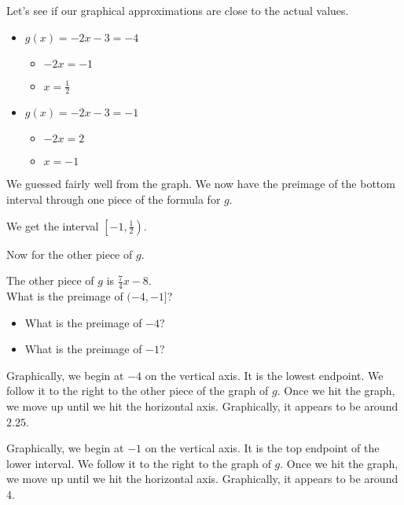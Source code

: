 \documentclass{ximera}
\begin{document}
Let's see if our graphical approximations are close to the actual values.



\begin{itemize}
\item $g(x) = -2x-3 = -4$
\begin{itemize}
\item $-2x = -1$
\item $x = \frac{1}{2}$
\end{itemize}
\end{itemize}

\begin{itemize}
\item $g(x) = -2x-3 = -1$
\begin{itemize}
\item $-2x = 2$
\item $x = -1$
\end{itemize}
\end{itemize}



We guessed fairly well from the graph.  We now have the preimage of the bottom interval through one piece of the formula for $g$.  


We get the interval $\left[ -1, \frac{1}{2} \right)$.


Now for the other piece of $g$.







The other piece of $g$ is $\frac{7}{4}x - 8$. \\


What is the preimage of $(-4, -1]$?


\begin{itemize}
\item What is the preimage of $-4$? 
\item What is the preimage of $-1$? 
\end{itemize}



Graphically, we begin at $-4$ on the vertical axis.  It is the lowest endpoint.  We follow it to the right to the other piece of the graph of $g$.  Once we hit the graph, we move up until we hit the horizontal axis.  Graphically, it appears to be around $2.25$.


Graphically, we begin at $-1$ on the vertical axis.  It is the top endpoint of the lower interval.  We follow it to the right to the graph of $g$.  Once we hit the graph, we move up until we hit the horizontal axis.  Graphically, it appears to be around $4$.
\end{document}
